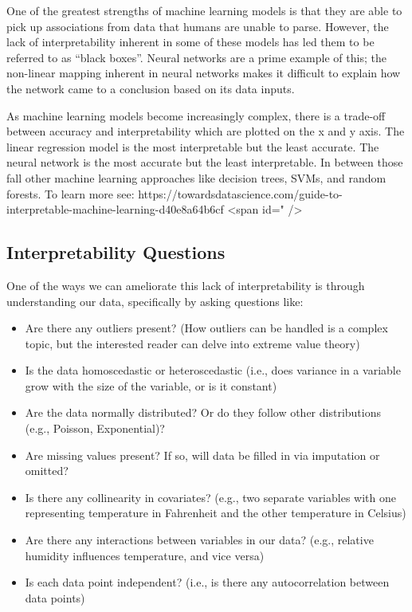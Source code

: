     One of the greatest strengths of machine learning models is that they are able to pick up associations from data that humans are unable to parse. However, the lack of interpretability inherent in some of these models has led them to be referred to as “black boxes”. Neural networks are a prime example of this; the non-linear mapping inherent in neural networks makes it difficult to explain how the network came to a conclusion based on its data inputs.
    
    
    As machine learning models become increasingly complex, there is a trade-off between accuracy and interpretability which are plotted on the x and y axis. The linear regression model is the most interpretable but the least accurate. The neural network is the most accurate but the least interpretable. In between those fall other machine learning approaches like decision trees, SVMs, and random forests. To learn more see: https://towardsdatascience.com/guide-to-interpretable-machine-learning-d40e8a64b6cf
    <span id=" />
    
\subsection{Interpretability Questions}

    One of the ways we can ameliorate this lack of interpretability is through understanding our data, specifically by asking questions like:

\begin{itemize}
  \item Are there any outliers present? (How outliers can be handled is a complex topic, but the interested reader can delve into extreme value theory)
  \item Is the data homoscedastic or heteroscedastic (i.e., does variance in a variable grow with the size of the variable, or is it constant)
  \item Are the data normally distributed? Or do they follow other distributions (e.g., Poisson, Exponential)?
  \item Are missing values present? If so, will data be filled in via imputation or omitted?
  \item Is there any collinearity in covariates? (e.g., two separate variables with one representing temperature in Fahrenheit and the other temperature in Celsius)
  \item Are there any interactions between variables in our data? (e.g., relative humidity influences temperature, and vice versa)
  \item Is each data point independent? (i.e., is there any autocorrelation between data points)
\end{itemize}

